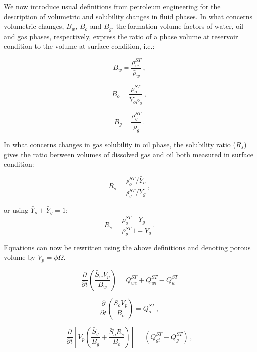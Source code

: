 \documentclass[authoryear,preprint,review,11pt]{elsarticle}
\begin{document}
We now introduce usual definitions from petroleum engineering for the description of volumetric and solubility changes in fluid phases. In what concerns volumetric changes, $B_w$, $B_o$ and $B_g$, the formation volume factors of water, oil and gas phases, respectively, express the ratio of a phase volume at reservoir condition to the volume at surface condition, i.e.:

\begin{equation}\label{eq: Bw}
B_w = \frac{\rho_w^{ST}}{\bar{\rho}_w} \, ,
\end{equation}

\begin{equation}\label{eq: Bo}
B_o = \frac{\rho_o^{ST}}{\bar{Y}_o \bar{\rho}_o} \, ,
\end{equation}

\begin{equation}\label{eq: Bg}
B_g = \frac{\rho_g^{ST}}{\bar{\rho}_g} \, .
\end{equation}

In what concerns changes in gas solubility in oil phase, the solubility ratio ($R_s$) gives the ratio between volumes of dissolved gas and oil both measured in surface condition:

\begin{equation}
R_s = \frac{\rho_o^{ST} / \bar{Y}_o}{\rho_g^{ST} / \bar{Y}_g} \, ,
\end{equation}

or using $\bar{Y}_o + \bar{Y}_g = 1$:
\begin{equation}
R_s = \frac{\rho_o^{ST}}{\rho_g^{ST}}\frac{\bar{Y}_g}{1-\bar{Y}_g} \, .
\end{equation}

Equations can now be rewritten using the above definitions and denoting porous volume by $V_p = \bar{\phi}\Omega$.

\begin{equation}\label{eq: Sw4}
\frac{\partial}{\partial t} \left(\frac{\bar{S}_w V_p}{B_w} \right) = Q_{we}^{ST} + Q_{wi}^{ST}-Q_w^{ST}
\end{equation}

\begin{equation}\label{eq: So4}
\frac{\partial}{\partial t} \left(\frac{\bar{S}_o V_p}{B_o} \right) = Q_o^{ST} \, ,
\end{equation}

\begin{equation}\label{eq: Sg4}
\frac{\partial}{\partial t} \left[ V_p \left(\frac{\bar{S}_g}{B_g} + \frac{\bar{S}_o R_s}{B_o} \right) \right] = \left( Q_{gi}^{ST}-Q_g^{ST} \right) \, ,
\end{equation}
\end{document}
